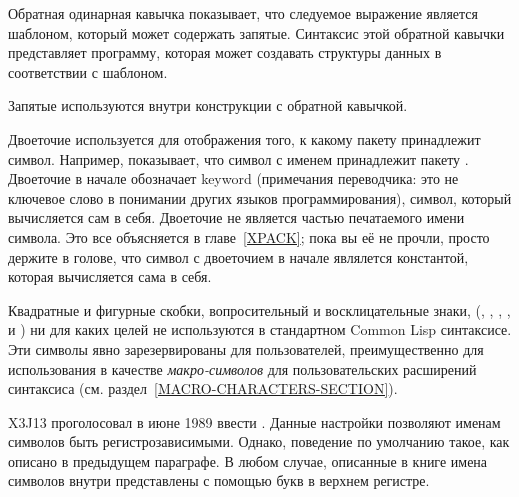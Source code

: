 \begin{indentdesc}{1.2pc}
\item[\cd{{\Xbq}}] Обратная одинарная кавычка показывает, что следуемое
выражение является шаблоном, который может содержать запятые. Синтаксис этой
обратной кавычки представляет программу, которая может создавать структуры
данных в соответствии с шаблоном.

\item[\cd{,}] Запятые используются внутри конструкции с обратной кавычкой.

\item[\cd{:}] Двоеточие используется для отображения того, к какому пакету
принадлежит символ. Например,  показывает, что символ с
именем  принадлежит пакету . Двоеточие в начале обозначает 
keyword (примечания переводчика: это не ключевое слово в понимании других языков 
программирования), символ, который вычисляется сам в себя. Двоеточие не является
частью печатаемого имени символа. 
Это все объясняется в главе~\ref{XPACK}; пока вы её не прочли, просто держите в
голове, что символ с двоеточием в начале являлется константой, которая
вычисляется сама в себя.
\end{indentdesc}

Квадратные и фигурные скобки, вопросительный и восклицательные знаки,
(\cd{{\Xlbracket}}, \cd{{\Xrbracket}}, \cd{{\Xlbrace}}, \cd{{\Xrbrace}}, 
и  \cd{!}) ни для каких целей не используются в стандартном Common Lisp 
синтаксисе. Эти символы явно зарезервированы для пользователей, преимущественно
для использования в качестве \emph{макро-символов} для пользовательских расширений
синтаксиса (см. раздел~\ref{MACRO-CHARACTERS-SECTION}).

\begin{newer}
X3J13 проголосовал в июне 1989 
ввести . Данные настройки позволяют именам символов быть
регистрозависимыми. Однако, поведение по умолчанию такое, как описано в
предыдущем параграфе. В любом случае, описанные в книге имена символов внутри
представлены с помощью букв в верхнем регистре.
\end{newer}

\fi
